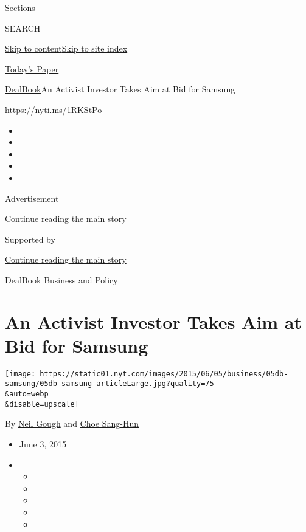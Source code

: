 Sections

SEARCH

\protect\hyperlink{site-content}{Skip to
content}\protect\hyperlink{site-index}{Skip to site index}

\href{https://myaccount.nytimes.com/auth/login?response_type=cookie\&client_id=vi}{}

\href{https://www.nytimes.com/section/todayspaper}{Today's Paper}

\href{/section/business/dealbook}{DealBook}\textbar{}An Activist
Investor Takes Aim at Bid for Samsung

\url{https://nyti.ms/1RKStPo}

\begin{itemize}
\item
\item
\item
\item
\item
\end{itemize}

Advertisement

\protect\hyperlink{after-top}{Continue reading the main story}

Supported by

\protect\hyperlink{after-sponsor}{Continue reading the main story}

DealBook Business and Policy

\hypertarget{an-activist-investor-takes-aim-at-bid-for-samsung}{%
\section{An Activist Investor Takes Aim at Bid for
Samsung}\label{an-activist-investor-takes-aim-at-bid-for-samsung}}

\texttt{[image: https://static01.nyt.com/images/2015/06/05/business/05db-samsung/05db-samsung-articleLarge.jpg?quality=75\\\&auto=webp\\\&disable=upscale]}

By \href{http://www.nytimes.com/by/neil-gough}{Neil Gough} and
\href{http://www.nytimes.com/by/choe-sang-hun}{Choe Sang-Hun}

\begin{itemize}
\item
  June 3, 2015
\item
  \begin{itemize}
  \item
  \item
  \item
  \item
  \item
  \end{itemize}
\end{itemize}

